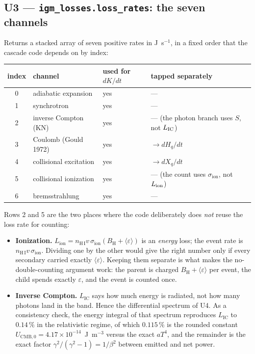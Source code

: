 \documentclass[11pt,a4paper]{article}
\newcommand{\code}[1]{\texttt{\small #1}}
\newcommand{\eps}{\varepsilon}
\newcommand{\BH}{B_{\mathrm{H}}}
\newcommand{\nHI}{n_{\mathrm{H\,I}}}
\newcommand{\sion}{\sigma_{\mathrm{ion}}}
\begin{document}
\subsection*{U3 --- \code{igm\_losses.loss\_rates}: the seven channels}

Returns a stacked array of seven positive rates in J~s$^{-1}$, in a fixed
order that the cascade code depends on by index:

\begin{center}
\begin{tabular}{clll}
\toprule
index & channel & used for $dK/dt$ & tapped separately \\
\midrule
0 & adiabatic expansion       & yes & --- \\
1 & synchrotron               & yes & --- \\
2 & inverse Compton (KN)      & yes & --- (the photon branch uses $S$, not $L_{\rm IC}$) \\
3 & Coulomb (Gould 1972)      & yes & $\to dH_q/dt$ \\
4 & collisional excitation    & yes & $\to dX_q/dt$ \\
5 & collisional ionization    & yes & --- (the count uses $\sion$, not $L_{\rm ion}$) \\
6 & bremsstrahlung            & yes & --- \\
\bottomrule
\end{tabular}
\end{center}

Rows 2 and 5 are the two places where the code deliberately does \emph{not}
reuse the loss rate for counting:

\begin{itemize}[leftmargin=1.3em]
\item \textbf{Ionization.}  $L_{\mathrm{ion}} = \nHI v\, \sion (\BH +
      \langle\eps\rangle)$ is an \emph{energy} loss; the event rate is
      $\nHI v\, \sion$.  Dividing one by the other would give the right number
      only if every secondary carried exactly $\langle\eps\rangle$.  Keeping
      them separate is what makes the no-double-counting argument work: the
      parent is charged $\BH + \langle\eps\rangle$ per event, the child spends
      exactly $\eps$, and the event is counted once.
\item \textbf{Inverse Compton.}  $L_{\mathrm{IC}}$ says how much energy is
      radiated, not how many photons land in the band.  Hence the differential
      spectrum of U4.  As a consistency check, the energy integral of that
      spectrum reproduces $L_{\mathrm{IC}}$ to $0.14\,\%$ in the relativistic
      regime, of which $0.115\,\%$ is the rounded constant
      $U_{\mathrm{CMB},0}=4.17\times10^{-14}$~J~m$^{-3}$ versus the exact
      $aT^4$, and the remainder is the exact factor
      $\gamma^2/(\gamma^2-1)=1/\beta^2$ between emitted and net power.
\end{itemize}
\end{document}
